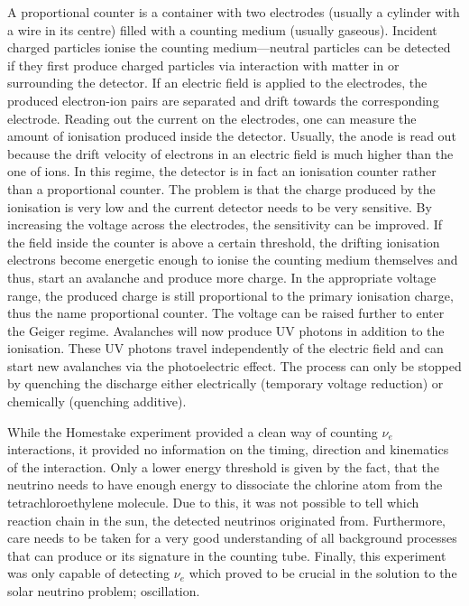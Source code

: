 A proportional counter is a container with two electrodes (usually a cylinder with a wire in its centre) filled with a counting medium (usually gaseous).
Incident charged particles ionise the counting medium---neutral particles can be detected if they first produce charged particles via interaction with matter in or surrounding the detector.
If an electric field is applied to the electrodes, the produced electron-ion pairs are separated and drift towards the corresponding electrode.
Reading out the current on the electrodes, one can measure the amount of ionisation produced inside the detector.
Usually, the anode is read out because the drift velocity of electrons in an electric field is much higher than the one of ions.
In this regime, the detector is in fact an ionisation counter rather than a proportional counter.
The problem is that the charge produced by the ionisation is very low and the current detector needs to be very sensitive.
By increasing the voltage across the electrodes, the sensitivity can be improved.
If the field inside the counter is above a certain threshold, the drifting ionisation electrons become energetic enough to ionise the counting medium themselves and thus, start an avalanche and produce more charge.
In the appropriate voltage range, the produced charge is still proportional to the primary ionisation charge, thus the name proportional counter.
The voltage can be raised further to enter the Geiger regime.
Avalanches will now produce UV photons in addition to the ionisation.
These UV photons travel independently of the electric field and can start new avalanches via the photoelectric effect.
The process can only be stopped by quenching the discharge either electrically (temporary voltage reduction) or chemically (quenching additive).

While the Homestake experiment provided a clean way of counting $\nu_e$ interactions, it provided no information on the timing, direction and kinematics of the interaction.
Only a lower energy threshold is given by the fact, that the neutrino needs to have enough energy to dissociate the chlorine atom from the tetrachloroethylene molecule.
Due to this, it was not possible to tell which reaction chain in the sun, the detected neutrinos originated from.
Furthermore, care needs to be taken for a very good understanding of all background processes that can produce  or its signature in the counting tube.
Finally, this experiment was only capable of detecting $\nu_e$ which proved to be crucial in the solution to the solar neutrino problem; oscillation.

